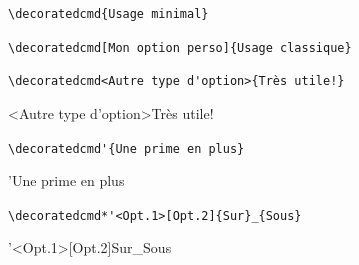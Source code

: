 \documentclass[varwidth, border = 3pt]{standalone}
\begin{document}
\verb#\decoratedcmd{Usage minimal}#



\medskip


\verb#\decoratedcmd[Mon option perso]{Usage classique}#



\medskip


\verb#\decoratedcmd<Autre type d'option>{Très utile!}#

\decoratedcmd<Autre type d'option>{Très utile!}


\medskip


\verb#\decoratedcmd'{Une prime en plus}#

\decoratedcmd'{Une prime en plus}


\medskip


\verb#\decoratedcmd*'<Opt.1>[Opt.2]{Sur}_{Sous}#

\decoratedcmd*'<Opt.1>[Opt.2]{Sur}_{Sous}
\end{document}
